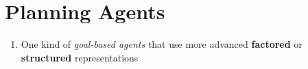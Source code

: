 \section{Planning Agents}\label{AI: Agent Programs/Planning Agents}


\begin{enumerate}
    \item One kind of \textit{goal-based agents} that use more advanced \textbf{factored} or \textbf{structured} representations
    \hfill \cite{ai/book/Artificial-Intelligence-A-Modern-Approach/Russell-Norvig}



\end{enumerate}














